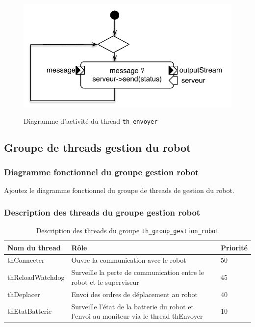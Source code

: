 \documentclass[11pt, a4paper]{paper}
\begin{document}
\begin{figure}[htbp]
\label{fig:act_envoyer}
\begin{center}
{\includegraphics[scale=.5]{./figures-pdf/act_envoyer}}
{\caption{Diagramme d'activité du thread {\tt th\_envoyer}}}
\end{center}
\end{figure}
\FloatBarrier

\subsection{Groupe de threads gestion du robot}

\subsubsection{Diagramme fonctionnel du groupe gestion robot}
{\color{blue} Ajoutez le diagramme fonctionnel du groupe de threads de gestion du robot.}

\subsubsection{Description des threads du groupe gestion robot}



\begin{table}[htp]
\caption{Description des threads du groupe {\tt th\_group\_gestion\_robot}}
\begin{center}
\begin{tabular}{|p{3cm}|p{8.5cm}|p{2cm}|}
\hline
\bf Nom du thread &	\bf Rôle &	\bf Priorité \\
\hline
\hline
\color{black}thConnecter &	\color{black}Ouvre la communication avec le robot &	\color{black}50\\
\hline
\color{black}thReloadWatchdog &	\color{black}Surveille la perte de communication entre le robot et le superviseur &	\color{black}45\\
\hline
\color{black}thDeplacer &	\color{black}Envoi des ordres de déplacement au robot &	\color{black}40\\
\hline
\color{black}thEtatBatterie &	\color{black}Surveille l'état de la batterie du robot et l'envoi au moniteur via le thread thEnvoyer &	\color{black}10\\
\hline
\end{tabular}
\end{center}
\label{tab:gt_moniteur}
\end{table}%
\FloatBarrier
\end{document}
